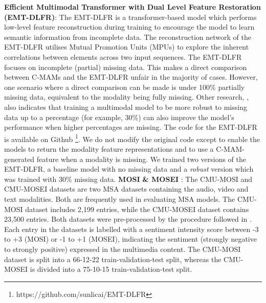 \textbf{Efficient Multimodal Transformer with Dual Level Feature Restoration (EMT-DLFR)}: The EMT-DLFR is a transformer-based model which performs low-level feature reconstruction during training to encourage the model to learn semantic information from incomplete data. The reconstruction network of the EMT-DLFR utilises Mutual Promotion Units (MPUs) to explore the inherent correlations between elements across two input sequences. The EMT-DLFR focuses on incomplete (partial) missing data. This makes a direct comparison between C-MAMs and the EMT-DLFR unfair in the majority of cases. However, one scenario where a direct comparison can be made is under 100\% partially missing data, equivalent to the modality being fully missing. Other research, \cite{hazarika2022analyzing}, also indicates that training a multimodal model to be more robust to missing data up to a percentage (for example, 30\%) can also improve the model's performance when higher percentages are missing. The code for the EMT-DLFR is available on Github \footnote{https://github.com/sunlicai/EMT-DLFR}. We do not modify the original code except to enable the models to return the modality feature representations and to use a C-MAM-generated feature when a modality is missing. We trained two versions of the EMT-DLFR, a baseline model with no missing data and a \textit{robust} version which was trained with 30\% missing data. \textbf{MOSI} \cite{mosi} \textbf{\& MOSEI} \cite{mosei}: The CMU-MOSI and CMU-MOSEI datasets are two MSA datasets containing the audio, video and text modalities. Both are frequently used in evaluating MSA models. The CMU-MOSI dataset includes 2,199 entries, while the CMU-MOSEI dataset contains 23,500 entries. Both datasets were pre-processed by the procedure followed in \cite{10122560}. Each entry in the datasets is labelled with a sentiment intensity score between -3 to +3 (MOSI) or -1 to +1 (MOSEI), indicating the sentiment (strongly negative to strongly positive) expressed in the multimedia content. The CMU-MOSI dataset is split into a 66-12-22 train-validation-test split, whereas the CMU-MOSEI is divided into a 75-10-15 train-validation-test split. 


